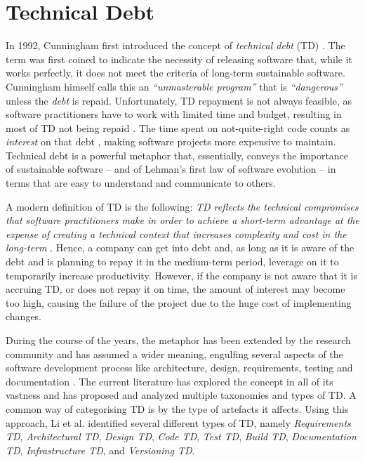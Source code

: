 \section{Technical Debt}
In 1992, Cunningham first introduced the concept of \emph{technical debt} (TD) \cite{Cunningham1992}. 
The term was first coined to indicate the necessity of releasing software that, while it works perfectly, it does not meet the criteria of long-term sustainable software. 
Cunningham himself calls this an \emph{``unmasterable program''} that is \emph{``dangerous''} unless the \emph{debt} is repaid.
Unfortunately, TD repayment is not always feasible, as software practitioners have to work with limited time and budget, resulting in most of TD not being repaid \cite{Digkas2018}.
The time spent on not-quite-right code counts as \emph{interest} on that debt \cite{Cunningham1992}, making software projects more expensive to maintain.
Technical debt is a powerful metaphor that, essentially, conveys the importance of sustainable software -- and of Lehman's first law of software evolution -- in terms that are easy to understand and communicate to others. 

A modern definition of TD is the following: \emph{TD reflects the technical compromises that software practitioners make in order to achieve a short-term advantage at the expense of creating a technical context that increases complexity and cost in the long-term} \cite{Avgeriou2016}. 
Hence, a company can get into debt and, as long as it is aware of the debt and is planning to repay it in the medium-term period, leverage on it to temporarily increase productivity.
However, if the company is not aware that it is accruing TD, or does not repay it on time, the amount of interest may become too high, causing the failure of the project due to the huge cost of implementing changes.

During the course of the years, the metaphor has been extended by the research community and has assumed a wider meaning, engulfing several aspects of the software development process like architecture, design, requirements, testing and documentation \cite{Brown2010}.
The current literature has explored the concept in all of its vastness and has proposed and analyzed multiple taxonomies and types of TD.
A common way of categorising TD is by the type of artefacts it affects. Using this approach, Li et al. \cite{Li2015} identified several different types of TD, namely \emph{Requirements TD}, \emph{Architectural TD}, \emph{Design TD}, \emph{Code TD}, \emph{Test TD}, \emph{Build TD}, \emph{Documentation TD}, \emph{Infrastructure TD}, and \emph{Versioning TD}.

